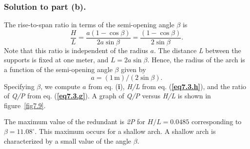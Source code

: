\documentclass{AeroStructure-ERJohnson}
\begin{document}
\begin{example}
\subsubsection{Solution to part (b).} The rise-to-span ratio in terms of the semi-opening angle $\beta$ is
\begin{equation}
\frac{H}{L}=\frac{a(1-\cos \beta)}{2 a \sin \beta}=\frac{(1-\cos \beta)}{2 \sin \beta}. \label{eq7.3.h}\tag{h}
\end{equation}
Note that this ratio is independent of the radius $a$. The distance \textit{L} between the supports is fixed at one meter, and $L=2 a \sin \beta$. Hence, the radius of the arch is a function of the semi-opening angle $\beta$ given by
\begin{equation}
a=(1\,\mathrm{m}) /(2 \sin \beta). \label{eq7.3.i}\tag{i}
\end{equation}
Specifying $\beta$, we compute $a$ from eq. (\textbf{i}), \textit{H/L} from eq. (\textbf{\ref{eq7.3.h}}), and the ratio of \textit{Q/P} from eq. (\textbf{\ref{eq7.3.g}}). A graph of \textit{Q/P} versus \textit{H/L} is shown in figure~\ref{fig7.9}.

{\def\thefigure{7.9}
}
\vspace*{-\baselineskip}


\noindent The maximum value of the redundant is \textit{2P} for $\textit{H/L} = 0.0485$ corresponding to $\beta=11.08^{\circ}$. This maximum occurs for a shallow arch. A shallow arch is characterized by a small value of the angle $\beta$.
\end{example}
\end{document}
